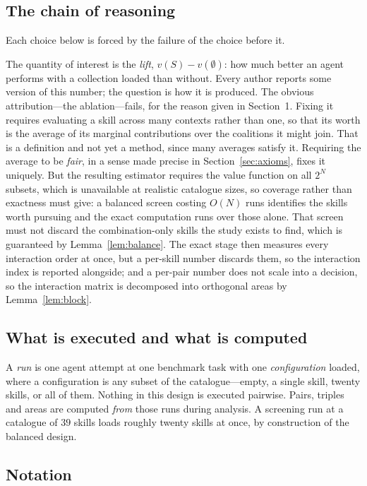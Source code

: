 \documentclass[11pt]{article}
\theoremstyle{plain}
\theoremstyle{definition}
\theoremstyle{remark}
\newcommand{\lift}{v(S) - v(\emptyset)}
\begin{document}
\subsection{The chain of reasoning}

Each choice below is forced by the failure of the choice before it.

The quantity of interest is the \emph{lift}, $\lift$: how much better an agent performs with a collection loaded than without. Every author reports some version of this number; the question is how it is produced. The obvious attribution---the ablation---fails, for the reason given in Section~1. Fixing it requires evaluating a skill across many contexts rather than one, so that its worth is the average of its marginal contributions over the coalitions it might join. That is a definition and not yet a method, since many averages satisfy it. Requiring the average to be \emph{fair}, in a sense made precise in Section~\ref{sec:axioms}, fixes it uniquely. But the resulting estimator requires the value function on all $2^N$ subsets, which is unavailable at realistic catalogue sizes, so coverage rather than exactness must give: a balanced screen costing $O(N)$ runs identifies the skills worth pursuing and the exact computation runs over those alone. That screen must not discard the combination-only skills the study exists to find, which is guaranteed by Lemma~\ref{lem:balance}. The exact stage then measures every interaction order at once, but a per-skill number discards them, so the interaction index is reported alongside; and a per-pair number does not scale into a decision, so the interaction matrix is decomposed into orthogonal areas by Lemma~\ref{lem:block}.

\subsection{What is executed and what is computed}

A \emph{run} is one agent attempt at one benchmark task with one \emph{configuration} loaded, where a configuration is any subset of the catalogue---empty, a single skill, twenty skills, or all of them. Nothing in this design is executed pairwise. Pairs, triples and areas are computed \emph{from} those runs during analysis. A screening run at a catalogue of $39$ skills loads roughly twenty skills at once, by construction of the balanced design.

\subsection{Notation}
\end{document}
